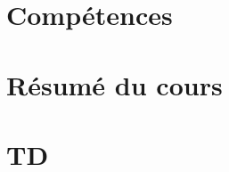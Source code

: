 \documentclass{poly}
\begin{document}
\maketitle{}

\part{Compétences}


\part{Résumé du cours}


% 

\part{TD}

\end{document}
